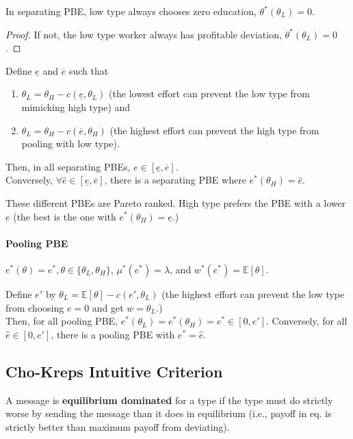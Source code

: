 \documentclass[11pt]{elegantbook}
\begin{document}
\begin{lemma}
    In separating PBE, low type always chooses zero education, $\theta^*(\theta_L)=0$.
\end{lemma}
\begin{proof}
    If not, the low type worker always has profitable deviation, $\theta^*(\theta_L)=0$.
\end{proof}

\begin{lemma}
    Define $\underline{e}$ and $\overline{e}$ such that
    \begin{enumerate}
        \item $\theta_L=\theta_H-c(\underline{e},\theta_L)$ (the lowest effort can prevent the low type from mimicking high type) and
        \item $\theta_L=\theta_H-c(\overline{e},\theta_H)$ (the highest effort can prevent the high type from pooling with low type).
    \end{enumerate}
    Then, in all separating PBEs, $e\in \left[\underline{e},\overline{e}\right]$.\\
    Conversely, $\forall \hat{e}\in \left[\underline{e},\overline{e}\right]$, there is a separating PBE where $e^*(\theta_H)=\hat{e}$.
\end{lemma}
These different PBEs are Pareto ranked. High type prefers the PBE with a lower $e$ (the best is the one with $e^*(\theta_H)=\underline{e}$.)

\paragraph*{Pooling PBE}
$e^*(\theta)=e^*,\theta\in\{\theta_L,\theta_H\}$, $\mu^*(e^*)=\lambda$, and $w^*(e^*)=\mathbb{E}[\theta]$.

\begin{lemma}
    Define $e'$ by $\theta_L=\mathbb{E}[\theta]-c(e',\theta_L)$ (the highest effort can prevent the low type from choosing $e=0$ and get $w=\theta_L$.)\\
    Then, for all pooling PBE, $e^*(\theta_L)=e^*(\theta_H)=e^*\in[0,e']$. Conversely, for all $\hat{e}\in [0,e']$, there is a pooling PBE with $e^*=\hat{e}$.
\end{lemma}


\subsection{Cho-Kreps Intuitive Criterion}
\begin{definition}
    \normalfont
    A message is \textbf{equilibrium dominated} for a type if the type must do strictly worse by sending the message than it does in equilibrium (i.e., payoff in eq. is strictly better than maximum payoff from deviating).
\end{definition}
\end{document}

